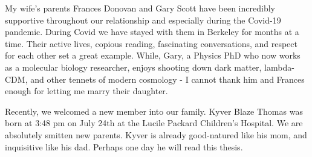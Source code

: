 My wife's parents Frances Donovan and Gary Scott have been incredibly supportive throughout our relationship and especially during the Covid-19 pandemic. During Covid we have stayed with them in Berkeley for months at a time. Their active lives, copious reading, fascinating conversations, and respect for each other set a great example. While, Gary, a Physics PhD who now works as a molecular biology researcher, enjoys shooting down dark matter, lambda-CDM, and other tennets of modern cosmology - I cannot thank him and Frances enough for letting me marry their daughter. 

Recently, we welcomed a new member into our family. Kyver Blaze Thomas was born at 3:48 pm on July 24th at the Lucile Packard Children's Hospital. We are absolutely smitten new parents. Kyver is already good-natured like his mom, and inquisitive like his dad. Perhaps one day he will read this thesis.
